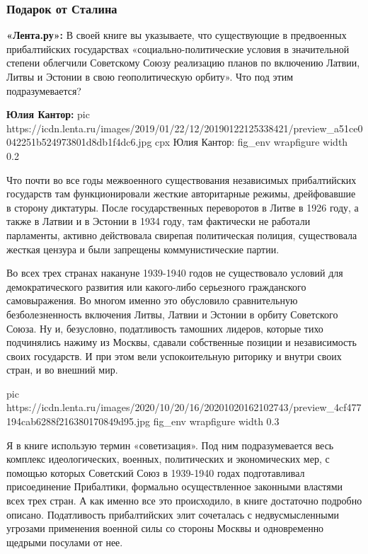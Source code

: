 \subsubsection{Подарок от Сталина}

\textbf{«Лента.ру»:} В своей книге вы указываете, что существующие в предвоенных
прибалтийских государствах «социально-политические условия в значительной
степени облегчили Советскому Союзу реализацию планов по включению Латвии, Литвы
и Эстонии в свою геополитическую орбиту». Что под этим подразумевается?

\textbf{Юлия Кантор:} 
\ifcmt
pic https://icdn.lenta.ru/images/2019/01/22/12/20190122125338421/preview_a51ce0042251b524973801d8db1f4dc6.jpg
cpx Юлия Кантор:
fig_env wrapfigure
width 0.2
\fi

Что почти во все годы межвоенного существования независимых прибалтийских
государств там функционировали жесткие авторитарные режимы, дрейфовавшие в
сторону диктатуры. После государственных переворотов в Литве в 1926 году, а
также в Латвии и в Эстонии в 1934 году, там фактически не работали парламенты,
активно действовала свирепая политическая полиция, существовала жесткая цензура
и были запрещены коммунистические партии.

Во всех трех странах накануне 1939-1940 годов не существовало условий для
демократического развития или какого-либо серьезного гражданского
самовыражения. Во многом именно это обусловило сравнительную безболезненность
включения Литвы, Латвии и Эстонии в орбиту Советского Союза. Ну и, безусловно,
податливость тамошних лидеров, которые тихо подчинялись нажиму из Москвы,
сдавали собственные позиции и независимость своих государств. И при этом вели
успокоительную риторику и внутри своих стран, и во внешний мир.

\ifcmt
pic https://icdn.lenta.ru/images/2020/10/20/16/20201020162102743/preview_4cf477194cab6288f216380170849d95.jpg
fig_env wrapfigure
width 0.3
\fi


Я в книге использую термин «советизация». Под ним подразумевается весь комплекс
идеологических, военных, политических и экономических мер, с помощью которых
Советский Союз в 1939-1940 годах подготавливал присоединение Прибалтики,
формально осуществленное законными властями всех трех стран. А как именно все
это происходило, в книге достаточно подробно описано. Податливость
прибалтийских элит сочеталась с недвусмысленными угрозами применения военной
силы со стороны Москвы и одновременно щедрыми посулами от нее.


